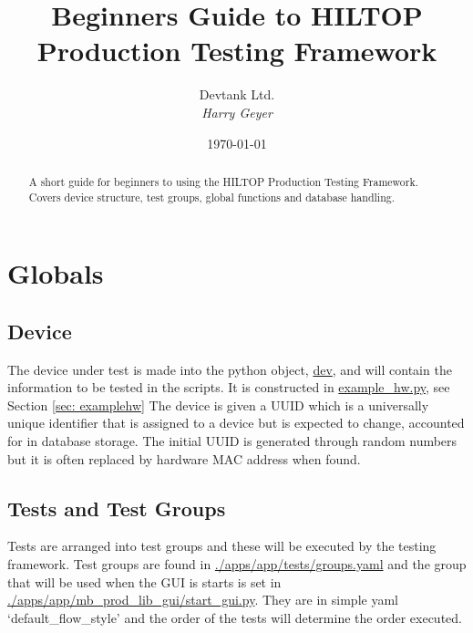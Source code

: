 \documentclass[a4paper,12pt, notitlepage]{article}
\begin{document}
\title{\textbf{\large{Beginners Guide to HILTOP Production Testing Framework}}}

\author{\normalsize{Devtank Ltd.} \\
        \small\textit{
        Harry Geyer}}
\date{\today}

\maketitle 
\thispagestyle{fancy}

\begin{abstract} 
\noindent
A short guide for beginners to using the HILTOP Production Testing Framework. Covers device structure, test groups, global functions and database handling. 
\end{abstract}

\tableofcontents
\newpage

\section{Globals}
\label{sec: globals}

\subsection{Device}
\label{ssec: globalsDev}

The device under test is made into the python object, \url{dev}, and will contain the information to be tested in the scripts. It is constructed in \url{example_hw.py}, see Section \ref{sec: examplehw} The device is given a UUID which is a universally unique identifier that is assigned to a device but is expected to change, accounted for in database storage. The initial UUID is generated through random numbers but it is often replaced by hardware MAC address when found.

\subsection{Tests and Test Groups}
\label{globalTests}

Tests are arranged into test groups and these will be executed by the testing framework. Test groups are found in \url{./apps/app/tests/groups.yaml} and the group that will be used when the GUI is starts is set in \url{./apps/app/mb_prod_lib_gui/start_gui.py}. They are in simple yaml `default\_flow\_style' and the order of the tests will determine the order executed.
\end{document}
